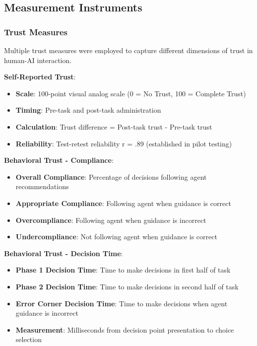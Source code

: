 \documentclass[12pt]{article}
\begin{document}
\subsection{Measurement Instruments}

\subsubsection{Trust Measures}

Multiple trust measures were employed to capture different dimensions of trust in human-AI interaction.

\textbf{Self-Reported Trust}:
\begin{itemize}
    \item \textbf{Scale}: 100-point visual analog scale (0 = No Trust, 100 = Complete Trust)
    \item \textbf{Timing}: Pre-task and post-task administration
    \item \textbf{Calculation}: Trust difference = Post-task trust - Pre-task trust
    \item \textbf{Reliability}: Test-retest reliability r = .89 (established in pilot testing)
\end{itemize}

\textbf{Behavioral Trust - Compliance}:
\begin{itemize}
    \item \textbf{Overall Compliance}: Percentage of decisions following agent recommendations
    \item \textbf{Appropriate Compliance}: Following agent when guidance is correct
    \item \textbf{Overcompliance}: Following agent when guidance is incorrect
    \item \textbf{Undercompliance}: Not following agent when guidance is correct
\end{itemize}

\textbf{Behavioral Trust - Decision Time}:
\begin{itemize}
    \item \textbf{Phase 1 Decision Time}: Time to make decisions in first half of task
    \item \textbf{Phase 2 Decision Time}: Time to make decisions in second half of task
    \item \textbf{Error Corner Decision Time}: Time to make decisions when agent guidance is incorrect
    \item \textbf{Measurement}: Milliseconds from decision point presentation to choice selection
\end{itemize}
\end{document}
